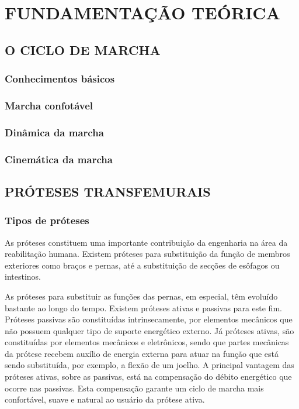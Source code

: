 \documentclass[a4paper, 12pt] {report}
\begin{document}
	\chapter{FUNDAMENTAÇÃO TEÓRICA}
		\section{O CICLO DE MARCHA}
			\subsection{Conhecimentos básicos}
			\subsection{Marcha confotável}
			\subsection{Dinâmica da marcha}
			\subsection{Cinemática da marcha}
		\section{PRÓTESES TRANSFEMURAIS}
			\subsection {Tipos de próteses}
				As próteses constituem uma importante contribuição da engenharia na área da reabilitação humana. Existem próteses para substituição da função de membros exteriores como braços e pernas, até a substituição de secções de esôfagos ou intestinos.

As próteses para substituir as funções das pernas, em especial, têm evoluído bastante ao longo do tempo. Existem próteses ativas e passivas para este fim. Próteses passivas são constituídas intrinsecamente, por elementos mecânicos que não possuem qualquer tipo de suporte energético externo. Já próteses ativas, são constituídas por elementos mecânicos e eletrônicos, sendo que partes mecânicas da prótese recebem auxílio de energia externa para atuar na função que está sendo substituída, por exemplo, a flexão de um joelho. A principal vantagem das próteses ativas, sobre as passivas, está na compensação do débito energético que ocorre nas passivas. Esta compensação garante um ciclo de marcha mais confortável, suave e natural ao usuário da prótese ativa.
\end{document}
